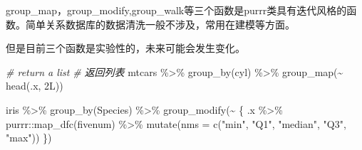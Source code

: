 \documentclass[
]{book}
\newenvironment{Shaded}{\begin{snugshade}}{\end{snugshade}}
\newcommand{\AttributeTok}[1]{\textcolor[rgb]{0.77,0.63,0.00}{#1}}
\newcommand{\CommentTok}[1]{\textcolor[rgb]{0.56,0.35,0.01}{\textit{#1}}}
\newcommand{\ConstantTok}[1]{\textcolor[rgb]{0.00,0.00,0.00}{#1}}
\newcommand{\FunctionTok}[1]{\textcolor[rgb]{0.00,0.00,0.00}{#1}}
\newcommand{\NormalTok}[1]{#1}
\newcommand{\OtherTok}[1]{\textcolor[rgb]{0.56,0.35,0.01}{#1}}
\newcommand{\SpecialCharTok}[1]{\textcolor[rgb]{0.00,0.00,0.00}{#1}}
\newcommand{\StringTok}[1]{\textcolor[rgb]{0.31,0.60,0.02}{#1}}
\begin{document}
group\_map，group\_modify,group\_walk等三个函数是purrr类具有迭代风格的函数。简单关系数据库的数据清洗一般不涉及，常用在建模等方面。

但是目前三个函数是实验性的，未来可能会发生变化。

\begin{Shaded}
\begin{Highlighting}[]
\CommentTok{\# return a list}
\CommentTok{\# 返回列表}
\NormalTok{mtcars }\SpecialCharTok{\%\textgreater{}\%}
  \FunctionTok{group\_by}\NormalTok{(cyl) }\SpecialCharTok{\%\textgreater{}\%}
  \FunctionTok{group\_map}\NormalTok{(}\SpecialCharTok{\textasciitilde{}} \FunctionTok{head}\NormalTok{(.x, 2L))}
\end{Highlighting}
\end{Shaded}

\begin{Shaded}
\begin{Highlighting}[]
\NormalTok{iris }\SpecialCharTok{\%\textgreater{}\%}
  \FunctionTok{group\_by}\NormalTok{(Species) }\SpecialCharTok{\%\textgreater{}\%}
  \FunctionTok{group\_modify}\NormalTok{(}\SpecialCharTok{\textasciitilde{}}\NormalTok{ \{}
\NormalTok{    .x }\SpecialCharTok{\%\textgreater{}\%}
\NormalTok{      purrr}\SpecialCharTok{::}\FunctionTok{map\_dfc}\NormalTok{(fivenum) }\SpecialCharTok{\%\textgreater{}\%}
      \FunctionTok{mutate}\NormalTok{(}\AttributeTok{nms =} \FunctionTok{c}\NormalTok{(}\StringTok{"min"}\NormalTok{, }\StringTok{"Q1"}\NormalTok{, }\StringTok{"median"}\NormalTok{, }\StringTok{"Q3"}\NormalTok{, }\StringTok{"max"}\NormalTok{))}
\NormalTok{  \})}
\end{Highlighting}
\end{Shaded}

\begin{Shaded}
\end{Shaded}
\end{document}
